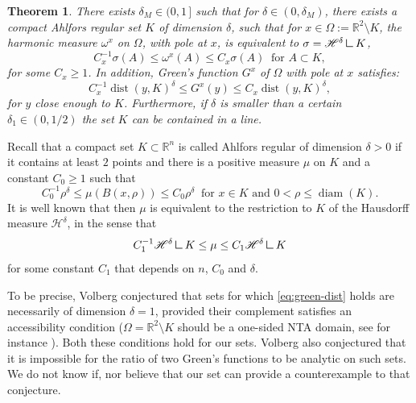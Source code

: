 \documentclass[10pt]{amsart}
\let\backslash\setminus
\let\sm\setminus
\numberwithin{equation}{section}
\theoremstyle{plain}
\newtheorem{thm}[lem]{Theorem}
\theoremstyle{definition}
\newcommand{\R}{\mathbb{R}}
\renewcommand{\H}{\mathscr{H}}
\DeclareMathOperator{\dist}{dist}
\DeclareMathOperator{\diam}{diam}
\newcommand{\mres}{\mathbin{\vrule height 1.6ex depth 0pt width
0.13ex\vrule height 0.13ex depth 0pt width 1.3ex}}
\begin{document}
\begin{thm}\label{thm:main}
There exists $\delta_M\in (0,1\,]$ such that for $\delta\in (0,\delta_M)$, there exists a compact Ahlfors regular set $K$ of dimension $\delta$, such that for $x\in \Omega := \R^2 \sm K$,
the harmonic measure $\omega^x$ on $\Omega$, with pole at $x$, is
equivalent to $\sigma = \mathscr{H}^\delta \mres K$, \ie
\begin{equation} \label{eq:measures-eq}
C_x^{-1} \sigma(A) \leq \omega^x(A) \leq C_x \sigma(A)
\ \text{ for } A\subset K,
\end{equation}
for some $C_x \geq 1$.
In addition, Green's function $G^x$ of $\Omega$ with pole at $x$ satisfies:
\begin{equation}\label{eq:green-dist}
C_x^{-1} \dist(y,K)^\delta \leq G^x(y) \leq C_x \dist(y,K)^\delta,
\end{equation}
for $y$ close enough to $K$.
Furthermore, if $\delta$ is smaller than a certain $\delta_1 \in (0,1/2)$
the set $K$ can be contained in a line.
\end{thm}


Recall that a compact set $K \subset \R^n$ is called Ahlfors regular
of dimension $\delta >0$ if it contains at least $2$ points and
there is a positive measure $\mu$ on $K$ and a constant $C_0 \geq 1$ such that
\begin{equation}\label{1a1}
C_0^{-1} \rho^\delta \leq \mu(B(x,\rho)) \leq C_0 \rho^\delta
\ \text{ for $x\in K$ and } 0 < \rho \leq \diam(K).
\end{equation}
It is well known that then $\mu$ is equivalent to the restriction to $K$
of the Hausdorff measure $\H^\delta$, in the sense that
\begin{equation}\label{1a2}
C_1^{-1} \H^\delta \mres K \leq \mu \leq C_1 \H^\delta \mres K
\end{equation}
for some constant $C_1$ that depends on $n$, $C_0$ and $\delta$.

To be precise, Volberg conjectured that sets for which \eqref{eq:green-dist} holds are necessarily of dimension $\delta=1$, provided their complement satisfies an accessibility condition ($\Omega=\R^2\backslash K$ should be a one-sided NTA domain, see for instance \cite{DFM-Memoirs}).
Both these conditions hold for our sets.
Volberg also conjectured that it is impossible for the ratio of two Green's functions to be analytic on such sets. We do not know if, nor believe that our set can provide a counterexample to that conjecture.
\end{document}
